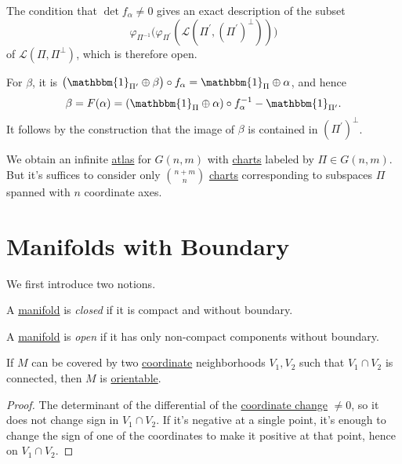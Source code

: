 \begin{note}
	The condition that \(\det f_\alpha \neq 0\) gives an exact description of the subset
	\[
		\varphi _{\Pi ^{-1} }\big(\varphi _{\Pi ^\prime }(\mathcal{L} (\Pi ^\prime , (\Pi ^\prime )^{\perp} ))\big)
	\]
	of \(\mathcal{L} (\Pi , \Pi ^{\perp} )\), which is therefore open.
\end{note}

For \(\beta \), it is \(\big(\mathbbm{1}_{\Pi ^\prime }\oplus \beta \big) \circ f_\alpha = \mathbbm{1}_{\Pi }\oplus \alpha  \), and hence
\[
	\beta = F(\alpha ) = (\mathbbm{1}_{\Pi }\oplus \alpha  )\circ f_\alpha ^{-1} - \mathbbm{1}_{\Pi ^\prime } .
\]
It follows by the construction that the image of \(\beta \) is contained in \((\Pi ^\prime )^{\perp} \).

\begin{remark}
	We obtain an infinite \hyperref[def:atlas]{atlas} for \(G(n, m)\) with \hyperref[def:coordinate-chart]{charts} labeled by \(\Pi \in G(n, m)\). But it's suffices to consider only \(\binom{n+m}{n}\) \hyperref[def:coordinate-chart]{charts} corresponding to subspaces \(\Pi \) spanned with \(n\) coordinate axes.
\end{remark}

\section{Manifolds with Boundary}
We first introduce two notions.
\begin{definition}\label{def:closed-manifold}
	A \hyperref[def:topological-manifold]{manifold} is \emph{closed} if it is compact and without boundary.
\end{definition}

\begin{definition}\label{def:open-manifold}
	A \hyperref[def:topological-manifold]{manifold} is \emph{open} if it has only non-compact components without boundary.
\end{definition}

\begin{lemma}
	If \(M\) can be covered by two \hyperref[def:coordinate-chart]{coordinate} neighborhoods \(V_1, V_2\) such that \(V_1 \cap V_2\) is connected, then \(M\) is \hyperref[def:orientable]{orientable}.
\end{lemma}
\begin{proof}
	The determinant of the differential of the \hyperref[def:coordinate-transition]{coordinate change} \(\neq 0\), so it does not change sign in \(V_1 \cap V_2\). If it's negative at a single point, it's enough to change the sign of one of the coordinates to make it positive at that point, hence on \(V_1 \cap V_2\).
\end{proof}


